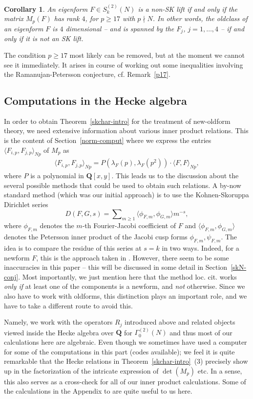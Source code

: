 \documentclass[11pt]{amsart}
\numberwithin{equation}{section}
\theoremstyle{plain}
\newtheorem{cor}[thm]{Corollary}
\theoremstyle{definition}
\newcommand{\thmref}[1]{Theorem~\ref{#1}}
\newcommand*{\Q}{\mathbf{Q}}
\newcommand{\lan}{\langle }
\newcommand{\ran}{\rangle}
\newcommand{\sumn}{\sum \nolimits}
\newcommand{\stwon}{S^{(2)}_k(N)}
\begin{document}
\begin{cor}
An eigenform $F\in \stwon$ is a non-SK lift if and only if the matrix $M_p(F)$ has rank $4$, for $p \ge 17$ with $p \nmid N$. In other words, the oldclass of an eigenform $F$  is $4$ dimensional -- and is spanned by the $F_j$, $j=1,\ldots,4$ -- if and only if it is not an SK lift. 
\end{cor}
The condition $p \ge 17$ most likely can be removed, but at the moment we cannot see it immediately. It arises in course of working out some inequalities involving the Ramanujan-Petersson conjecture, cf. Remark~\ref{p17}.

\subsection{Computations in the Hecke algebra}
In order to obtain \thmref{skchar-intro} for the treatment of new-oldform theory, we need extensive information about various inner product relations. This is the content of Section~\ref{norm-comput} where we express the entries $\displaystyle \lan F_{i,p}, F_{j,p} \ran_{Np}$ of $M_p$ as 
\begin{align} \label{norm-reln-intro}
 \lan F_{i,p}, F_{j,p} \ran_{Np}= P(\lambda_F(p),\lambda_F(p^2)) \cdot  \lan F, F \ran_{Np},
\end{align} 
 where $P$ is a polynomial in $\Q[x,y]$. This leads us to the discussion about the several possible methods that could be used to obtain such relations. A by-now standard method (which was our initial approach) is to use the Kohnen-Skoruppa Dirichlet series 
 \[ \displaystyle D(F,G,s) = \sumn_{m \ge 1} \lan \phi_{F,m}, \phi_{G,m} \ran m^{-s},\]
 where $\phi_{F,m}$ denotes the $m$-th Fourier-Jacobi coefficient of $F$ and $\lan \phi_{F,m}, \phi_{G,m} \ran$ denotes the Petersson inner product of the Jacobi cusp forms $\phi_{F,m}, \psi_{F,m}$. The idea is to compare the residue of this series at $s=k$ in two ways.
 Indeed, for a newform $F$, this is the approach taken in \cite{Ag-Br}. However, there seem to be some inaccuracies in this paper -- this will be discussed in some detail in Section~\ref{skN-conj}. Most importantly, we just mention here that the method loc. cit. works \textit{only if} at least one of the components is a newform, and \textit{not} otherwise. Since we also have to work with oldforms, this distinction plays an important role, and we have to take a different route to avoid this.

Namely, we work with the operators $R_j$ introduced above and related objects viewed inside the Hecke algebra over $\Q$ for $\Gamma^{(2)}_0(N)$ and thus most of our calculations here are algebraic. Even though we sometimes have used a computer for some of the computations in this part (codes available); we feel it is quite remarkable that the Hecke relations in \thmref{skchar-intro}~(3) precisely show up in the factorization of the intricate expression of $\det (M_p)$ etc. In a sense, this also serves as a cross-check for all of our inner product calculations.
Some of the calculations in the Appendix to \cite{blo-pohl} are quite useful to us here. 
\end{document}
